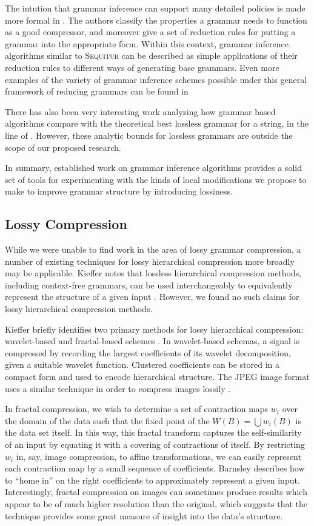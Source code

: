 \documentclass[11pt]{article}
\newcommand{\Sequitur}{\textsc{Sequitur}\xspace}
\begin{document}
The intution that grammar inference can support many detailed policies is made
more formal in \cite{grammarcodes}.  The authors classify the properties a
grammar needs to function as a good compressor, and moreover give a set of
reduction rules for putting a grammar into the appropriate form.  Within this
context, grammar inference algorithms similar to \Sequitur can be described as
simple applications of their reduction rules to different ways of generating
base grammars.  Even more examples of the variety of grammar inference schemes
possible under this general framework of reducing grammars can be found in
\cite{efficientgreedy}

There has also been very interesting work analyzing how grammar based
algorithms compare with the theoretical best lossless grammar for a string, in
the line of \cite{approximation}.  However, these analytic bounds for lossless
grammars are outside the scope of our proposed research.

In summary, established work on grammar inference algorithms provides a solid
set of tools for experimenting with the kinds of local modifications we propose
to make to improve grammar structure by introducing lossiness.

\subsection{Lossy Compression}

While we were unable to find work in the area of lossy grammar compression, a
number of existing techniques for lossy hierarchical compression more broadly
may be applicable.  Kieffer notes that lossless hierarchical compression
methods, including context-free grammars, can be used interchangeably to
equivalently represent the structure of a given input \cite{tutorial}.
However, we found no such claims for lossy hierarchical compression methods.

Kieffer briefly identifies two primary methods for lossy hierarchical
compression: wavelet-based and fractal-based schemes \cite{tutorial}.  In
wavelet-based schemas, a signal is compressed by recording the largest
coefficients of its wavelet decomposition, given a suitable wavelet function.
Clustered coefficients can be stored in a compact form and used to encode
hierarchical structure.  The JPEG image format uses a similar technique in
order to compress images lossily \cite{jpeg}.

In fractal compression, we wish to determine a set of contraction maps $w_i$
over the domain of the data such that the fixed point of the $W(B) = \bigcup
w_i(B)$ is the data set itself.  In this way, this fractal transform captures
the self-similarity of an input by equating it with a covering of contractions
of itself.  By restricting $w_i$ in, say, image compression, to affine
transformations, we can easily represent each contraction map by a small
sequence of coefficients.  Barnsley describes how to ``home in'' on the right
coefficients to approximately represent a given input.  Interestingly, fractal
compression on images can sometimes produce results which appear to be of much
higher resolution than the original, which suggests that the technique provides
some great measure of insight into the data's structure.
\end{document}
